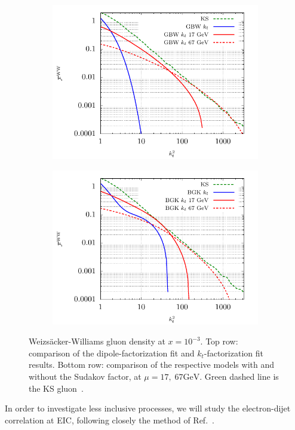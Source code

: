 \documentclass[12pt]{article}
\numberwithin{equation}{section}
\numberwithin{table}{section}
\numberwithin{figure}{section}
\begin{document}
\begin{figure}[t]
\begin{subfigure}{0.5\textwidth}
        \includegraphics[width=\textwidth]{plots/GBWWW2} 
    \end{subfigure}
    \begin{subfigure}{0.5\textwidth}
        \includegraphics[width=\textwidth]{plots/BGKWW2} 
    \end{subfigure}
    \caption{\footnotesize Weizs\"acker-Williams gluon density at $x=10^{-3}$. Top row: comparison of the dipole-factorization fit and $k_t$-factorization fit results. Bottom row: comparison of the respective models with and without the Sudakov factor, at $\mu=17,\;67 \mathrm{GeV}$. Green dashed line is the KS gluon~\cite{vanHameren:2021sqc}. }
    \label{fig:ww}
\end{figure}
In order to investigate less inclusive processes, we will study the electron-dijet correlation at EIC, following closely the method of Ref.~\cite{vanHameren:2021sqc}. 
\end{document}
